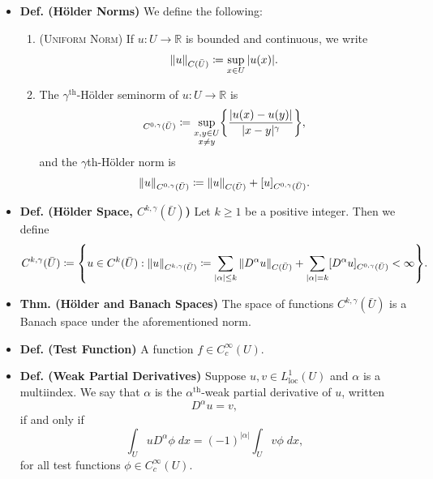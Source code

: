 \documentclass{article}
\begin{document}
\begin{itemize}
		\item \textbf{Def. (H\"older Norms)} We define the following: \vspace{-0.25cm}
		\begin{enumerate}[itemsep =-2pt,label = (\roman{*})]
			\item (\textsc{Uniform Norm}) If $u: U\to \mathbb{R}$ is bounded and continuous, we write 
			\begin{equation*}
				\left\Vert u \right\Vert_{C(\bar{U})} \coloneqq \sup_{x \in U}|u(x)|. 
			\end{equation*}
			\item The $\gamma^{\text{th}}$-H\"older seminorm of $u: U \to \mathbb{R}$ is 
			\begin{equation*}
				[u]_{C^{0,\gamma}(\bar{U})} \coloneqq \sup_{\substack{x, y \in U \\ x \neq y}}\brac*{\frac{|u(x) - u(y)|}{|x-y|^{\gamma}}}, 
			\end{equation*}
			and the $\gamma$th-H\"older norm is 
			\begin{equation*}
				\left\Vert u \right\Vert_{C^{0,\gamma}(\bar{U})}\coloneqq \left\Vert u \right\Vert_{C(\bar{U})} + [u]_{C^{0,\gamma}(\bar{U})}. 
			\end{equation*}
		\end{enumerate}
		
		\item \textbf{Def. (H\"older Space, $C^{k, \gamma}(\bar{U})$)} Let $k \geq 1$ be a positive integer. Then we define 
		\begin{equation*}
			C^{k,\gamma}(\bar{U}) \coloneqq \brac*{u \in C^{k}(\bar{U}): \norm{u}_{C^{k,\gamma}(\bar{U})} \coloneqq \sum_{|\alpha|\leq k}\norm{D^{\alpha}u}_{C(\bar{U})} + \sum_{|\alpha| = k}[D^{\alpha}u]_{C^{0,\gamma}(\bar{U})} < \infty}. 
		\end{equation*}
		
		\item \textbf{Thm. (H\"older and Banach Spaces)} The space of functions $C^{k,\gamma}(\bar{U})$ is a Banach space under the aforementioned norm. 
		
		\item \textbf{Def. (Test Function)} A function $f \in C_{c}^{\infty}(U)$. 
		
		\item \textbf{Def. (Weak Partial Derivatives)} Suppose $u, v \in L^{1}_{\text{loc}}(U)$ and $\alpha$ is a multiindex. We say that $\alpha$ is the $\alpha^{\text{th}}$-weak partial derivative of $u$, written 
		\begin{equation*}
			D^{\alpha}u = v, 
		\end{equation*}
		if and only if 
		\begin{equation*}
			\int_{U}uD^{\alpha}\phi\;dx = (-1)^{|\alpha|}\int_{U}v\phi\;dx, 
		\end{equation*}
		for all test functions $\phi \in C_{c}^{\infty}(U)$. 
		

\end{itemize}
\end{document}
